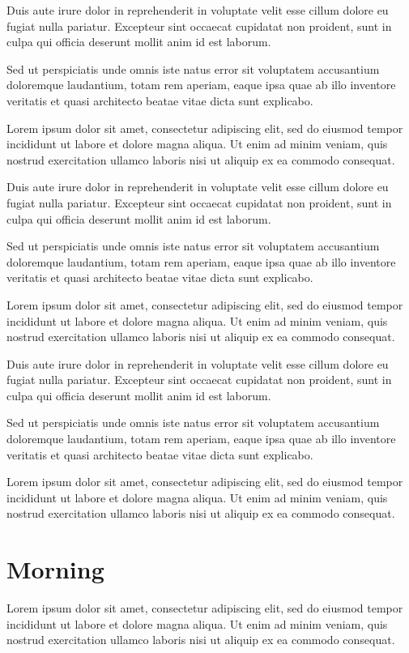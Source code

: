\documentclass{memoir}
\begin{document}
Duis aute irure dolor in reprehenderit in voluptate velit esse cillum dolore eu fugiat nulla pariatur. Excepteur sint occaecat cupidatat non proident, sunt in culpa qui officia deserunt mollit anim id est laborum.

Sed ut perspiciatis unde omnis iste natus error sit voluptatem accusantium doloremque laudantium, totam rem aperiam, eaque ipsa quae ab illo inventore veritatis et quasi architecto beatae vitae dicta sunt explicabo.

Lorem ipsum dolor sit amet, consectetur adipiscing elit, sed do eiusmod tempor incididunt ut labore et dolore magna aliqua. Ut enim ad minim veniam, quis nostrud exercitation ullamco laboris nisi ut aliquip ex ea commodo consequat.

Duis aute irure dolor in reprehenderit in voluptate velit esse cillum dolore eu fugiat nulla pariatur. Excepteur sint occaecat cupidatat non proident, sunt in culpa qui officia deserunt mollit anim id est laborum.

Sed ut perspiciatis unde omnis iste natus error sit voluptatem accusantium doloremque laudantium, totam rem aperiam, eaque ipsa quae ab illo inventore veritatis et quasi architecto beatae vitae dicta sunt explicabo.

Lorem ipsum dolor sit amet, consectetur adipiscing elit, sed do eiusmod tempor incididunt ut labore et dolore magna aliqua. Ut enim ad minim veniam, quis nostrud exercitation ullamco laboris nisi ut aliquip ex ea commodo consequat.

Duis aute irure dolor in reprehenderit in voluptate velit esse cillum dolore eu fugiat nulla pariatur. Excepteur sint occaecat cupidatat non proident, sunt in culpa qui officia deserunt mollit anim id est laborum.

Sed ut perspiciatis unde omnis iste natus error sit voluptatem accusantium doloremque laudantium, totam rem aperiam, eaque ipsa quae ab illo inventore veritatis et quasi architecto beatae vitae dicta sunt explicabo.

Lorem ipsum dolor sit amet, consectetur adipiscing elit, sed do eiusmod tempor incididunt ut labore et dolore magna aliqua. Ut enim ad minim veniam, quis nostrud exercitation ullamco laboris nisi ut aliquip ex ea commodo consequat.
\chapter{Morning}
Lorem ipsum dolor sit amet, consectetur adipiscing elit, sed do eiusmod tempor incididunt ut labore et dolore magna aliqua. Ut enim ad minim veniam, quis nostrud exercitation ullamco laboris nisi ut aliquip ex ea commodo consequat.
\end{document}
